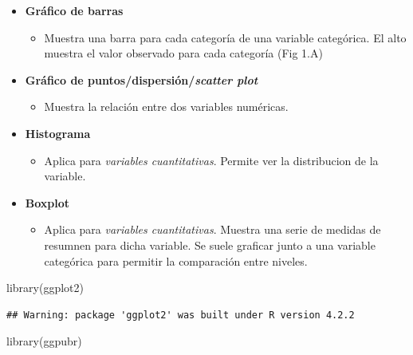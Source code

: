 \documentclass[
]{book}
\newenvironment{Shaded}{\begin{snugshade}}{\end{snugshade}}
\newcommand{\FunctionTok}[1]{\textcolor[rgb]{0.00,0.00,0.00}{#1}}
\newcommand{\NormalTok}[1]{#1}
\providecommand{\tightlist}{%
  \setlength{\itemsep}{0pt}\setlength{\parskip}{0pt}}
\begin{document}
\begin{itemize}
\tightlist
\item
  \textbf{Gráfico de barras}

  \begin{itemize}
  \tightlist
  \item
    Muestra una barra para cada categoría de una variable categórica. El alto muestra el valor observado para cada categoría (Fig 1.A)
  \end{itemize}
\item
  \textbf{Gráfico de puntos/dispersión/\emph{scatter plot}}

  \begin{itemize}
  \tightlist
  \item
    Muestra la relación entre dos variables numéricas.
  \end{itemize}
\item
  \textbf{Histograma}

  \begin{itemize}
  \tightlist
  \item
    Aplica para \emph{variables cuantitativas}. Permite ver la distribucion de la variable.
  \end{itemize}
\item
  \textbf{Boxplot}

  \begin{itemize}
  \tightlist
  \item
    Aplica para \emph{variables cuantitativas}. Muestra una serie de medidas de resumnen para dicha variable. Se suele graficar junto a una variable categórica para permitir la comparación entre niveles.
  \end{itemize}
\end{itemize}

\begin{Shaded}
\begin{Highlighting}[]
\FunctionTok{library}\NormalTok{(ggplot2)}
\end{Highlighting}
\end{Shaded}

\begin{verbatim}
## Warning: package 'ggplot2' was built under R version 4.2.2
\end{verbatim}

\begin{Shaded}
\begin{Highlighting}[]
\FunctionTok{library}\NormalTok{(ggpubr)}
\end{Highlighting}
\end{Shaded}
\end{document}
